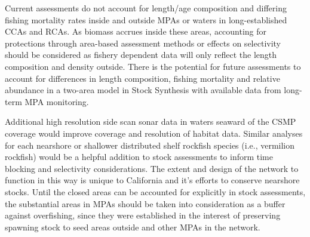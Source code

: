\documentclass[11pt,
  english,
  a4paper,
]{article}
\begin{document}
\leavevmode\tagmcend\tagstructend


Current assessments do not account for length/age composition and differing fishing mortality rates inside and outside MPAs or waters in long-established CCAs and RCAs. As biomass accrues inside these areas, accounting for protections through area-based assessment methods or effects on selectivity should be considered as fishery dependent data will only reflect the length composition and density outside. There is the potential for future assessments to account for differences in length composition, fishing mortality and relative abundance in a two-area model in Stock Synthesis with available data from long-term MPA monitoring.

\leavevmode\tagmcend\tagstructend\par


Additional high resolution side scan sonar data in waters seaward of the CSMP coverage would improve coverage and resolution of habitat data. Similar analyses for each nearshore or shallower distributed shelf rockfish species (i.e., vermilion rockfish) would be a helpful addition to stock assessments to inform time blocking and selectivity considerations. The extent and design of the network to function in this way is unique to California and it's efforts to conserve nearshore stocks. Until the closed areas can be accounted for explicitly in stock assessments, the substantial areas in MPAs should be taken into consideration as a buffer against overfishing, since they were established in the interest of preserving spawning stock to seed areas outside and other MPAs in the network.

\leavevmode\tagmcend\tagstructend\par

\newpage

\begingroup\fontsize{10}{12}\selectfont
\begingroup\fontsize{10}{12}\selectfont
\end{document}
